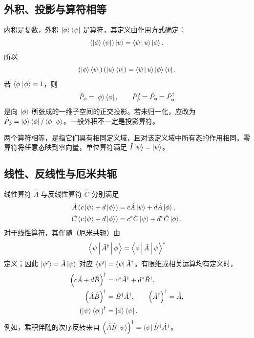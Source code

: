 \subsection{外积、投影与算符相等}
内积是复数，外积 $\Ket{\phi}\Bra{\psi}$ 是算符，其定义由作用方式确定：
\begin{equation}
\left(\Ket{\phi}\Bra{\psi}\right)\Ket{u}
=\Braket{\psi|u}\Ket{\phi}.
\end{equation}
所以
\begin{equation}
\left(\Ket{\phi}\Bra{\psi}\right)\left(\Ket{u}\Bra{v}\right)
=\Braket{\psi|u}\Ket{\phi}\Bra{v}.
\end{equation}
若 $\Braket{\phi|\phi}=1$，则
\begin{equation}
\hat P_\phi=\Ket{\phi}\Bra{\phi},\qquad
\hat P_\phi^2=\hat P_\phi=\hat P_\phi^\dagger
\end{equation}
是向 $\Ket{\phi}$ 所张成的一维子空间的正交投影。若未归一化，应改为
$\hat P_\phi=\Ket{\phi}\Bra{\phi}/\Braket{\phi|\phi}$。一般外积不一定是投影算符。

两个算符相等，是指它们具有相同定义域，且对该定义域中所有态的作用相同。零算符将任意态映到零向量，单位算符满足 $\hat I\Ket{\psi}=\Ket{\psi}$。

\subsection{线性、反线性与厄米共轭}
线性算符 $\hat A$ 与反线性算符 $\hat C$ 分别满足
\begin{align}
\hat A\left(c\Ket{\psi}+d\Ket{\phi}\right)&=c\hat A\Ket{\psi}+d\hat A\Ket{\phi},\\
\hat C\left(c\Ket{\psi}+d\Ket{\phi}\right)&=c^*\hat C\Ket{\psi}+d^*\hat C\Ket{\phi}.
\end{align}
对于线性算符，其伴随（厄米共轭）由
\begin{equation}
\Braket{\psi|\hat A^\dagger|\phi}
=\Braket{\phi|\hat A|\psi}^*
\label{eq:adjoint}
\end{equation}
定义；因此 $\Ket{\psi'}=\hat A\Ket{\psi}$ 对应
$\Bra{\psi'}=\Bra{\psi}\hat A^\dagger$。有限维或相关运算均有定义时，
\begin{align}
\left(c\hat A+d\hat B\right)^\dagger&=c^*\hat A^\dagger+d^*\hat B^\dagger,\\
\left(\hat A\hat B\right)^\dagger&=\hat B^\dagger\hat A^\dagger,\qquad
\left(\hat A^\dagger\right)^\dagger=\hat A,\\
\left(\Ket{\psi}\Bra{\phi}\right)^\dagger&=\Ket{\phi}\Bra{\psi}.
\end{align}
例如，乘积伴随的次序反转来自
$\left(\hat A\hat B\Ket{\psi}\right)^\dagger=\Bra{\psi}\hat B^\dagger\hat A^\dagger$。

